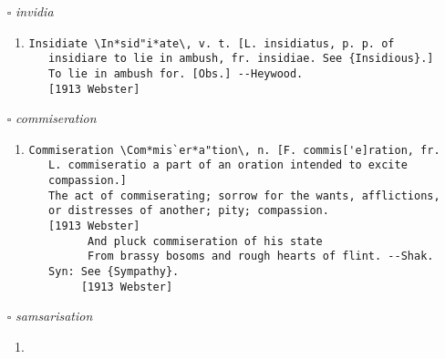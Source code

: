 \documentclass{article}
\begin{document}
\begin{itemize}
\begin{enumerate}
\item{
\begin{lstlisting}
Soakage \Soak"age\, n.
   The act of soaking, or the state of being soaked; also, the
   quantity that enters or issues by soaking.
   [1913 Webster]
\end{lstlisting}}
\end{enumerate}
\item[$\square$] \emph{ invidia }
\begin{enumerate}
\item{
\begin{lstlisting}
Insidiate \In*sid"i*ate\, v. t. [L. insidiatus, p. p. of
   insidiare to lie in ambush, fr. insidiae. See {Insidious}.]
   To lie in ambush for. [Obs.] --Heywood.
   [1913 Webster]
\end{lstlisting}}
\end{enumerate}
\item[$\square$] \emph{ commiseration }
\begin{enumerate}
\item{
\begin{lstlisting}
Commiseration \Com*mis`er*a"tion\, n. [F. commis['e]ration, fr.
   L. commiseratio a part of an oration intended to excite
   compassion.]
   The act of commiserating; sorrow for the wants, afflictions,
   or distresses of another; pity; compassion.
   [1913 Webster]
         And pluck commiseration of his state
         From brassy bosoms and rough hearts of flint. --Shak.
   Syn: See {Sympathy}.
        [1913 Webster]
\end{lstlisting}}
\end{enumerate}
\item[$\square$] \emph{ samsarisation }
\begin{enumerate}
\item{
\begin{lstlisting}


\end{lstlisting}}
\end{enumerate}
\end{itemize}
\end{document}
